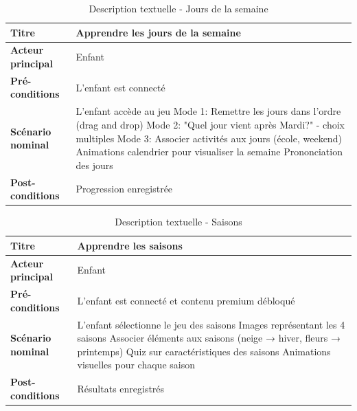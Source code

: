 \documentclass[12pt,a4paper]{report}
\begin{document}
\begin{table}[H]
\centering
\begin{tabular}{|p{4cm}|p{10cm}|}
\hline
\textbf{Titre} & Apprendre les jours de la semaine \\
\hline
\textbf{Acteur principal} & Enfant \\
\hline
\textbf{Pré-conditions} & L'enfant est connecté \\
\hline
\textbf{Scénario nominal} & 
L'enfant accède au jeu \newline
Mode 1: Remettre les jours dans l'ordre (drag and drop) \newline
Mode 2: "Quel jour vient après Mardi?" - choix multiples \newline
Mode 3: Associer activités aux jours (école, weekend) \newline
Animations calendrier pour visualiser la semaine \newline
Prononciation des jours \\
\hline
\textbf{Post-conditions} & Progression enregistrée \\
\hline
\end{tabular}
\caption{Description textuelle - Jours de la semaine}
\end{table}

\begin{table}[H]
\centering
\begin{tabular}{|p{4cm}|p{10cm}|}
\hline
\textbf{Titre} & Apprendre les saisons \\
\hline
\textbf{Acteur principal} & Enfant \\
\hline
\textbf{Pré-conditions} & L'enfant est connecté et contenu premium débloqué \\
\hline
\textbf{Scénario nominal} & 
L'enfant sélectionne le jeu des saisons \newline
Images représentant les 4 saisons \newline
Associer éléments aux saisons (neige → hiver, fleurs → printemps) \newline
Quiz sur caractéristiques des saisons \newline
Animations visuelles pour chaque saison \\
\hline
\textbf{Post-conditions} & Résultats enregistrés \\
\hline
\end{tabular}
\caption{Description textuelle - Saisons}
\end{table}
\end{document}
